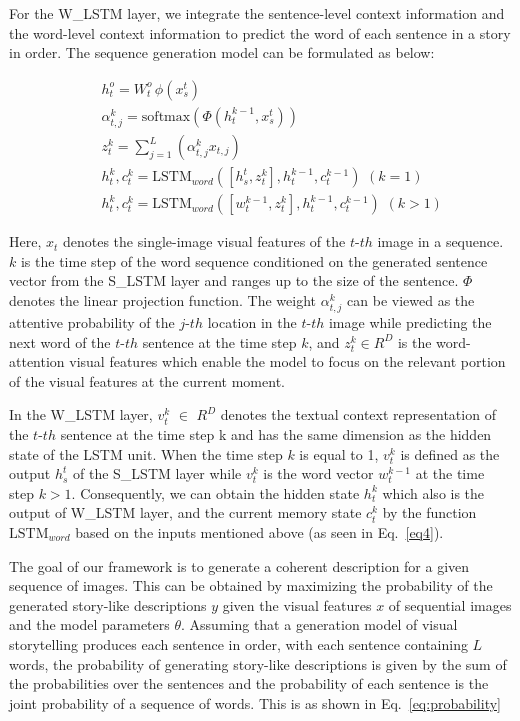 \documentclass[a4paper,fleqn]{cas-sc}
\begin{document}
For the W\_LSTM layer, we integrate the sentence-level context information and the word-level context information to predict the word of each sentence in a story in order. The sequence generation model can be formulated as below:

\begin{eqnarray}
&& h^o_t = W^o_t \, \phi(x^t_s)  \nonumber\\
&& \alpha^k_{t,j} = \text{softmax}(\Phi(h^{k-1}_t, x^t_s))  \nonumber\\
&& z^k_t = \sum_{j=1}^L (\alpha^k_{t,j}x_{t,j})   \nonumber\\
&& h^k_t, c^k_t = {\text{LSTM}_{word}}([h_s^t,z_t^k], h_t^{k-1}, c_t^{k-1}) \,\,(k=1) \nonumber\\
&& h^k_t, c^k_t = {\text{LSTM}_{word}}([w_t^{k-1},z_t^k], h_t^{k-1}, c_t^{k-1}) \,\,(k>1)   \label{eq4} 
\end{eqnarray}

Here, $x_t$ denotes the single-image visual features of the $t$-${th}$ image in a sequence. $k$ is the time step of the word sequence conditioned on the generated sentence vector from the S\_LSTM layer and ranges up to  the size of the sentence. 
 $\Phi$ denotes the linear projection function.
The weight $\alpha^k_{t,j}$ can be viewed as the attentive probability of the $j$-${th}$ location in the $t$-${th}$ image while predicting the next word of the $t$-${th}$ sentence at the time step $k$, and $z_t^k \in R^D$ is the word-attention visual features which enable the model to focus on the relevant portion of the visual features at the current moment.

In the W\_LSTM layer, $v^k_t$ $\in$ $R^D$ denotes the textual context representation of the $t$-${th}$ sentence at the time step k and has the same dimension as the hidden state of the LSTM unit. When the time step $k$ is equal to 1, $v^k_t$ is defined as the output $h^t_s$ of the S\_LSTM layer while $v^k_t$ is the word vector $w^{k-1}_t$ at the time step $k > 1$. Consequently, we can obtain the hidden state $h^k_t$ which also is the output of W\_LSTM layer, and the current memory state $c^k_t$ by the function $\text{LSTM}_{word}$ based on the inputs mentioned above (as seen in Eq.~\ref{eq4}).

The goal of our framework is to generate a coherent description for a given sequence of images. This can be obtained by maximizing the probability of the generated story-like descriptions $y$ given the visual features $x$ of sequential images and the model parameters $\theta$. Assuming that a generation model of visual storytelling produces each sentence in order, with each sentence containing $L$ words, the probability of generating story-like descriptions is given by the sum of the probabilities over the sentences and the probability of each sentence is the joint probability of a sequence of words. This is as shown in Eq.~\ref{eq:probability}
 
\end{document}
